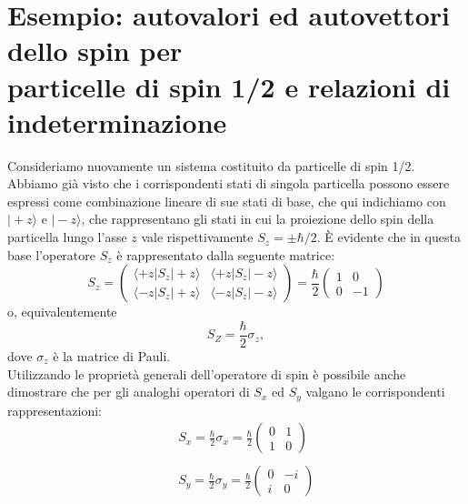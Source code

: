 \section[Esempio: autovalori ed autovettori dello spin per particelle di spin 1/2 e relazioni di indeterminazione]{Esempio: autovalori ed autovettori dello spin per\\ particelle di spin 1/2 e relazioni di indeterminazione}
Consideriamo nuovamente un sistema costituito da particelle di spin 1/2. Abbiamo già visto che i corrispondenti stati di singola particella possono essere espressi come combinazione lineare di sue stati di base, che qui indichiamo con $\vert +z\rangle $ e $\vert - z \rangle$, che rappresentano gli stati in cui la proiezione dello spin della particella lungo l'asse $z$ vale rispettivamente $S_z = \pm \hbar /2$. È evidente che in questa base l'operatore $S_z$ è rappresentato dalla seguente matrice:
\begin{equation}
S_z = \left( 
\begin{array}{cc}
\langle +z \vert S_z \vert +z \rangle &  \langle +z \vert S_z \vert -z \rangle \\
\langle -z \vert S_z \vert +z \rangle & \langle -z \vert S_z \vert -z \rangle  
\end{array}
\right)= \frac{\hbar}{2}\begin{pmatrix}
1 & 0 \\
0 & -1
\end{pmatrix}
\end{equation}
o, equivalentemente
\begin{equation}
S_Z =\frac{\hbar}{2}\sigma _z,
\end{equation}
dove $\sigma _z$ è la matrice di Pauli.\\
Utilizzando le proprietà generali dell'operatore di spin è possibile anche dimostrare che per gli analoghi operatori di $S_x$ ed $S_y$ valgano le corrispondenti rappresentazioni:
\begin{eqnarray}
& &\displaystyle{S_x = \frac{\hbar}{2}\sigma _x= \frac{\hbar}{2}\begin{pmatrix}
0 & 1 \\
1 & 0
\end{pmatrix}
} \\
\nonumber \\
& &\displaystyle{S_y= \frac{\hbar}{2}\sigma _y = \frac{\hbar}{2} \begin{pmatrix}
0 & -i \\
i & 0
\end{pmatrix}}
\end{eqnarray}
